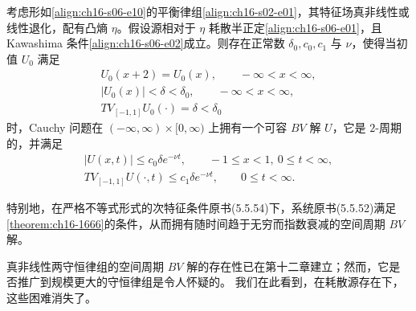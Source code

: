 \documentclass[../../main.tex]{subfiles}
\begin{document}
\begin{theorem}\label{theorem:ch16-1666}
考虑形如\eqref{align:ch16-s06-e10}的平衡律组\eqref{align:ch16-s02-e01}，其特征场真非线性或线性退化，配有凸熵 $\eta$。假设源相对于 $\eta$ 耗散半正定\eqref{align:ch16-s06-e01}，且 Kawashima 条件\eqref{align:ch16-s06-e02}成立。则存在正常数 $\delta_0,c_0,c_1$ 与 $\nu$，使得当初值 $U_0$ 满足
\begin{align}
U_0(x+2)=U_0(x),\qquad-\infty<x<\infty,
\label{align:ch16-s06-e88}\\
|U_0(x)|<\delta<\delta_0,\qquad-\infty<x<\infty,
\label{align:ch16-s06-e89}\\
TV_{[-1,1]}U_0(\cdot)=\delta<\delta_0
\label{align:ch16-s06-e90}
\end{align}
时，Cauchy 问题在 $(-\infty,\infty)\times[0,\infty)$ 上拥有一个可容 $BV$ 解 $U$，它是 $2$-周期的，并满足
\begin{align}
|U(x,t)|\leqslant c_0\delta e^{-\nu t},\qquad-1\leqslant x<1,\ 0\leqslant t<\infty,
\label{align:ch16-s06-e91}\\
TV_{[-1,1]}U(\cdot,t)\leqslant c_1\delta e^{-\nu t},\qquad 0\leqslant t<\infty.
\label{align:ch16-s06-e92}
\end{align}
\end{theorem}

特别地，在严格不等式形式的次特征条件原书(5.5.54)下，系统原书(5.5.52)满足\cref{theorem:ch16-1666}的条件，从而拥有随时间趋于无穷而指数衰减的空间周期 $BV$ 解。

真非线性两守恒律组的空间周期 $BV$ 解的存在性已在第十二章建立；然而，它是否推广到规模更大的守恒律组是令人怀疑的。
我们在此看到，在耗散源存在下，这些困难消失了。
\end{document}
